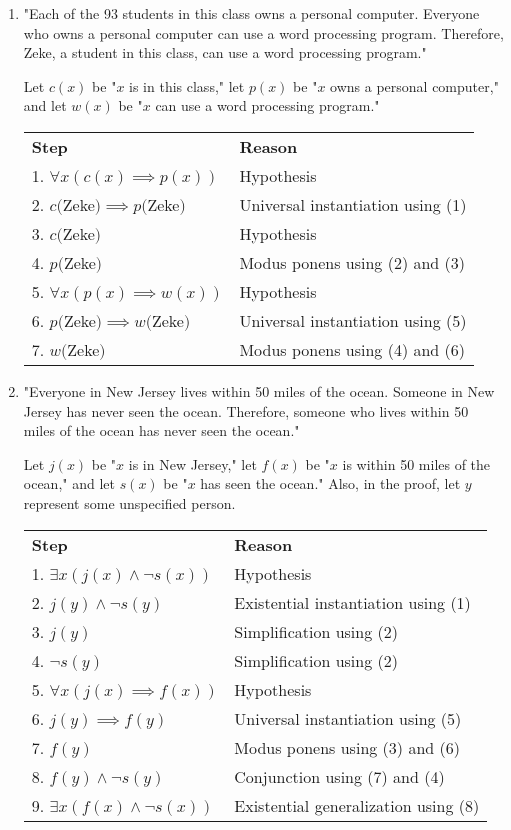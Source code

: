 \documentclass[11pt]{article}
\begin{document}
\begin{enumerate}[label=\textbf{\arabic*.}]
\begin{enumerate}[label=\textbf{\alph*)}]
		\item "Each of the 93 students in this class owns a personal computer. Everyone who owns a personal computer can use a word processing program. Therefore, Zeke, a student in this class, can use a word processing program."
		
		Let $c(x)$ be "$x$ is in this class," let $p(x)$ be "$x$ owns a personal computer," and let $w(x)$ be "$x$ can use a word processing program."
		
		\begin{center}
		\begin{tabular}{ll}
			\textbf{Step} & \textbf{Reason} \\
			1. $\forall x(c(x) \implies p(x))$ & Hypothesis \\
			2. $c($Zeke$) \implies p($Zeke$)$ & Universal instantiation using (1) \\
			3. $c($Zeke$)$ & Hypothesis \\
			4. $p($Zeke$)$ & Modus ponens using (2) and (3) \\
			5. $\forall x(p(x) \implies w(x))$ & Hypothesis \\
			6. $p($Zeke$) \implies w($Zeke$)$ & Universal instantiation using (5) \\
			7. $w($Zeke$)$ & Modus ponens using (4) and (6)
		\end{tabular}
		\end{center}
		
		\item "Everyone in New Jersey lives within 50 miles of the ocean. Someone in New Jersey has never seen the ocean. Therefore, someone who lives within 50 miles of the ocean has never seen the ocean."
		
		Let $j(x)$ be "$x$ is in New Jersey," let $f(x)$ be "$x$ is within 50 miles of the ocean," and let $s(x)$ be "$x$ has seen the ocean." Also, in the proof, let $y$ represent some unspecified person.
		
		\begin{center}
		\begin{tabular}{ll}
			\textbf{Step} & \textbf{Reason} \\
			1. $\exists x(j(x) \land \neg s(x))$ & Hypothesis \\
			2. $j(y) \land \neg s(y)$ & Existential instantiation using (1) \\
			3. $j(y)$ & Simplification using (2) \\
			4. $\neg s(y)$ & Simplification using (2) \\
			5. $\forall x(j(x) \implies f(x))$ & Hypothesis \\
			6. $j(y) \implies f(y)$ & Universal instantiation using (5) \\
			7. $f(y)$ & Modus ponens using (3) and (6) \\
			8. $f(y) \land \neg s(y)$ & Conjunction using (7) and (4) \\
			9. $\exists x(f(x) \land \neg s(x))$ & Existential generalization using (8)
		\end{tabular}
		\end{center}
	\end{enumerate}


\end{enumerate}
\end{document}
